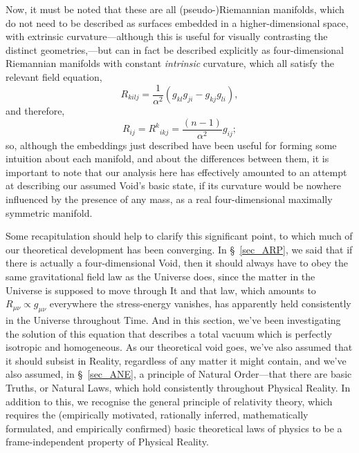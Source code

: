 Now, it must be noted that these are all (pseudo-)Riemannian manifolds, which do not need to be described as surfaces embedded in a higher-dimensional space, with extrinsic curvature---although this is useful for visually contrasting the distinct geometries,---but can in fact be described explicitly as four-dimensional Riemannian manifolds with constant \textit{intrinsic} curvature, which all satisfy the relevant field equation,
\begin{equation}
R_{kilj}=\frac{1}{\alpha^2}(g_{kl}g_{ji}-g_{kj}g_{li}),
\end{equation}
and therefore,
\begin{equation}
R_{ij}={R^{k}}_{ikj}=\frac{(n-1)}{\alpha^2}g_{ij};
\end{equation}
so, although the embeddings just described have been useful for forming some intuition about each manifold, and about the differences between them, it is important to note that our analysis here has effectively amounted to an attempt at describing our assumed Void's basic state, if its curvature would be nowhere influenced by the presence of any mass, as a real four-dimensional maximally symmetric manifold.

Some recapitulation should help to clarify this significant point, to which much of our theoretical development has been converging. In \S~\ref{sec_ARP}, we said that if there is actually a four-dimensional Void, then it should always have to obey the same gravitational field law as the Universe does, since the matter in the Universe is supposed to move through It and that law, which amounts to $R_{\mu\nu}\propto{g_{\mu\nu}}$ everywhere the stress-energy vanishes, has apparently held consistently in the Universe throughout Time. And in this section, we've been investigating the solution of this equation that describes a total vacuum which is perfectly isotropic and homogeneous. As our theoretical void goes, we've also assumed that it should subsist in Reality, regardless of any matter it might contain, and we've also assumed, in \S~\ref{sec_ANE}, a principle of Natural Order---that there are basic Truths, or Natural Laws, which hold consistently throughout Physical Reality. In addition to this, we recognise the general principle of relativity theory, which requires the (empirically motivated, rationally inferred, mathematically formulated, and empirically confirmed) basic theoretical laws of physics to be a frame-independent property of Physical Reality. 

